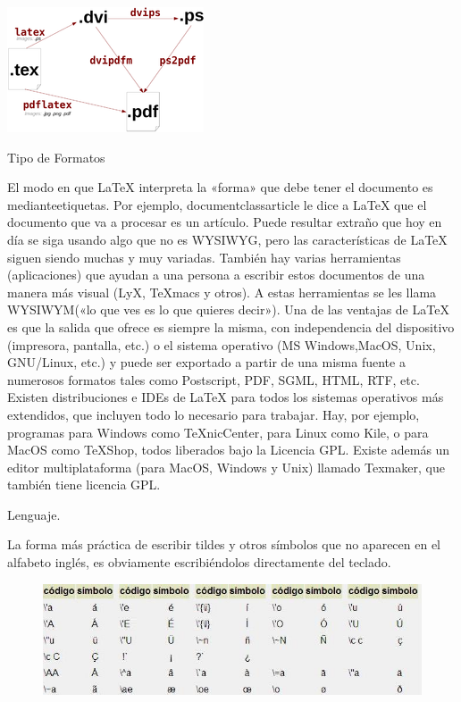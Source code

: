 \documentclass[10pt,oneside]{report}
\begin{document}
{\begin{floatingfigure}[r]{4.5cm}
\includegraphics{./imagenes/formato.jpg}
\caption{Tipo de Formatos}
\end{floatingfigure}
El modo en que LaTeX interpreta la «forma» que debe tener el documento es medianteetiquetas. Por ejemplo, documentclass{article} le dice a LaTeX que el documento que va a procesar es un artículo. Puede resultar extraño que hoy en día se siga usando algo que no es WYSIWYG, pero las características de LaTeX siguen siendo muchas y muy variadas. También hay varias herramientas (aplicaciones) que ayudan a una persona a escribir estos documentos de una manera más visual (LyX, TeXmacs y otros). A estas herramientas se les llama WYSIWYM(«lo que ves es lo que quieres decir»).
Una de las ventajas de LaTeX es que la salida que ofrece es siempre la misma, con independencia del dispositivo (impresora, pantalla, etc.) o el sistema operativo (MS Windows,MacOS, Unix, GNU/Linux, etc.) y puede ser exportado a partir de una misma fuente a numerosos formatos tales como Postscript, PDF, SGML, HTML, RTF, etc. Existen distribuciones e IDEs de LaTeX para todos los sistemas operativos más extendidos, que incluyen todo lo necesario para trabajar. Hay, por ejemplo, programas para Windows como TeXnicCenter, para Linux como Kile, o para MacOS como TeXShop, todos liberados bajo la Licencia GPL. Existe además un editor multiplataforma (para MacOS, Windows y Unix) llamado Texmaker, que también tiene licencia GPL. \newline \newline
\begin{bf} Lenguaje. \end{bf} \newline \newline La forma más práctica de escribir tildes y otros símbolos que no aparecen en el alfabeto inglés, es obviamente escribiéndolos directamente del teclado.
\begin{figure}[h]
	\centering
	\includegraphics[width=.80\textwidth]{./imagenes/lenguaje1.jpg}

\end{figure}}
\end{document}
